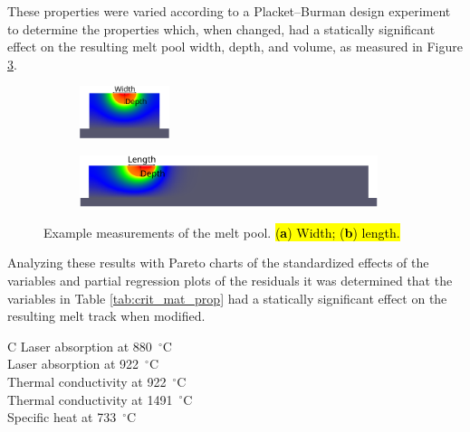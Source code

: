 \documentclass[metals,article,accept,pdftex,moreauthors]{Definitions/mdpi}
\begin{document}
These properties were varied according to a Placket--Burman design experiment to 
determine the properties which, when changed, had a statically significant effect on the 
resulting melt pool width, depth, and volume, as measured in Figure \ref{fig:slices}.

\begin{figure}[H]
\begin{subfigure}[t]{0.22\textwidth}
\includegraphics[height=0.6in]{slice_y_annotated}
\caption{\centering}
\label{fig:slice_y_annotated}
\end{subfigure}
\begin{subfigure}[t]{0.77\textwidth}
\includegraphics[height=0.6in]{slice_x_annotated}
\caption{\centering}
\label{fig:slice_x_annotated}
\end{subfigure}
\caption{Example measurements of the melt pool. \hl{(\textbf{a}) Width; (\textbf{b}) 
length.}}
\label{fig:slices}
\end{figure}

Analyzing these results with Pareto charts of the standardized effects of the variables and partial regression plots of the residuals it was determined that the variables in Table \ref{tab:crit_mat_prop} had a statically significant effect on the resulting melt track when modified.

\begin{table}[H]
\caption{\hl{Critical} %
 material properties.}
\label{tab:crit_mat_prop}
\begin{tabularx}{\textwidth}{C}
\toprule
Laser absorption at 880~$^{\circ}$C \\ \midrule
Laser absorption at 922~$^{\circ}$C \\ \midrule
Thermal conductivity at 922~$^{\circ}$C \\ \midrule
Thermal conductivity at 1491~$^{\circ}$C \\ \midrule
Specific heat at 733~$^{\circ}$C \\ 
\bottomrule			
\end{tabularx}
\end{table}
\end{document}
